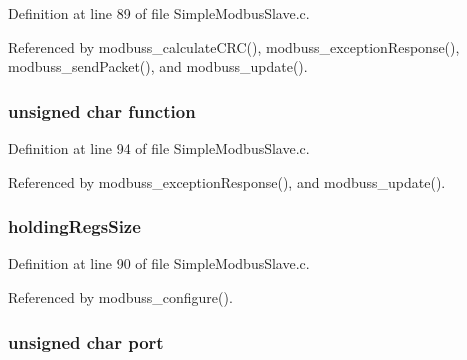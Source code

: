 Definition at line 89 of file Simple\-Modbus\-Slave.\-c.



Referenced by modbuss\-\_\-calculate\-C\-R\-C(), modbuss\-\_\-exception\-Response(), modbuss\-\_\-send\-Packet(), and modbuss\-\_\-update().

\hypertarget{struct_m_o_d_b_u_s_s___d_a_t_a_aa975eee0843aaf71c1023b79871849b9}{
\subsubsection[{function}]{\setlength{\rightskip}{0pt plus 5cm}unsigned char function}}\label{struct_m_o_d_b_u_s_s___d_a_t_a_aa975eee0843aaf71c1023b79871849b9}


Definition at line 94 of file Simple\-Modbus\-Slave.\-c.



Referenced by modbuss\-\_\-exception\-Response(), and modbuss\-\_\-update().

\hypertarget{struct_m_o_d_b_u_s_s___d_a_t_a_afbecce71fe40843114ff8c05dc8236a3}{
\subsubsection[{holding\-Regs\-Size}]{ holding\-Regs\-Size}}\label{struct_m_o_d_b_u_s_s___d_a_t_a_afbecce71fe40843114ff8c05dc8236a3}


Definition at line 90 of file Simple\-Modbus\-Slave.\-c.



Referenced by modbuss\-\_\-configure().

\hypertarget{struct_m_o_d_b_u_s_s___d_a_t_a_ac89e2c19de60b8f23bdd3789b2af094d}{
\subsubsection[{port}]{\setlength{\rightskip}{0pt plus 5cm}unsigned char port}}\label{struct_m_o_d_b_u_s_s___d_a_t_a_ac89e2c19de60b8f23bdd3789b2af094d}


